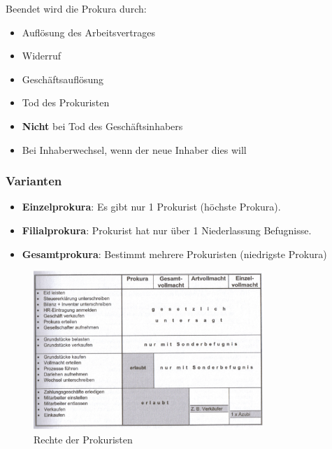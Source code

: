\documentclass[10pt]{article}
\begin{document}
\break

Beendet  wird  die  Prokura durch:
\begin{itemize}
\item Auflösung des Arbeitsvertrages
\item Widerruf
\item Geschäftsauflösung
\item Tod des Prokuristen
\item \textbf{Nicht}  bei Tod des Geschäftsinhabers
\item Bei Inhaberwechsel, wenn der neue Inhaber dies will
\end{itemize}


\subsubsection{Varianten}
\begin{itemize}
\item \textbf{Einzelprokura}: Es gibt nur 1  Prokurist (höchste Prokura).
\item \textbf{Filialprokura}: Prokurist hat nur über 1 Niederlassung Befugnisse.
\item \textbf{Gesamtprokura}: Bestimmt mehrere Prokuristen (niedrigste Prokura)
\end{itemize}

\begin{figure}[H]
\begin{center}
  \includegraphics[height=6cm]{prokura.png}
  \end{center}
  \caption{Rechte der Prokuristen}
  \label{fig:Rechte der Prokuristen}
\end{figure}
\end{document}
